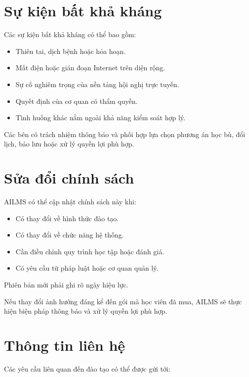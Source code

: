 \documentclass[12pt,a4paper]{article}
\begin{document}
\section{Sự kiện bất khả kháng}

Các sự kiện bất khả kháng có thể bao gồm:

\begin{itemize}
    \item Thiên tai, dịch bệnh hoặc hỏa hoạn.
    \item Mất điện hoặc gián đoạn Internet trên diện rộng.
    \item Sự cố nghiêm trọng của nền tảng hội nghị trực tuyến.
    \item Quyết định của cơ quan có thẩm quyền.
    \item Tình huống khác nằm ngoài khả năng kiểm soát hợp lý.
\end{itemize}

Các bên có trách nhiệm thông báo và phối hợp lựa chọn phương án
học bù, đổi lịch, bảo lưu hoặc xử lý quyền lợi phù hợp.

\section{Sửa đổi chính sách}

AILMS có thể cập nhật chính sách này khi:

\begin{itemize}
    \item Có thay đổi về hình thức đào tạo.
    \item Có thay đổi về chức năng hệ thống.
    \item Cần điều chỉnh quy trình học tập hoặc đánh giá.
    \item Có yêu cầu từ pháp luật hoặc cơ quan quản lý.
\end{itemize}

Phiên bản mới phải ghi rõ ngày hiệu lực.

Nếu thay đổi ảnh hưởng đáng kể đến gói mà học viên đã mua,
AILMS sẽ thực hiện biện pháp thông báo và xử lý quyền lợi phù hợp.

\section{Thông tin liên hệ}

Các yêu cầu liên quan đến đào tạo có thể được gửi tới:
\end{document}
